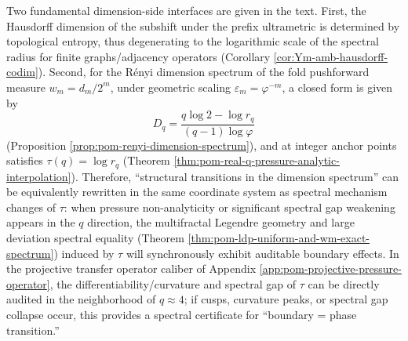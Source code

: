 \begin{remark}\label{rem:pom-dimension-matrix-pressure-unified}
Two fundamental dimension-side interfaces are given in the text.
First, the Hausdorff dimension of the subshift under the prefix ultrametric is determined by topological entropy, thus degenerating to the logarithmic scale of the spectral radius for finite graphs/adjacency operators (Corollary \ref{cor:Ym-amb-hausdorff-codim}).
Second, for the Rényi dimension spectrum of the fold pushforward measure \(w_m=d_m/2^m\), under geometric scaling \(\varepsilon_m=\varphi^{-m}\), a closed form is given by
\[
D_q=\frac{q\log 2-\log r_q}{(q-1)\log\varphi}
\]
(Proposition \ref{prop:pom-renyi-dimension-spectrum}), and at integer anchor points satisfies \(\tau(q)=\log r_q\) (Theorem \ref{thm:pom-real-q-pressure-analytic-interpolation}).
Therefore, ``structural transitions in the dimension spectrum'' can be equivalently rewritten in the same coordinate system as spectral mechanism changes of \(\tau\): when pressure non-analyticity or significant spectral gap weakening appears in the \(q\) direction, the multifractal Legendre geometry and large deviation spectral equality (Theorem \ref{thm:pom-ldp-uniform-and-wm-exact-spectrum}) induced by \(\tau\) will synchronously exhibit auditable boundary effects.
In the projective transfer operator caliber of Appendix \ref{app:pom-projective-pressure-operator}, the differentiability/curvature and spectral gap of \(\tau\) can be directly audited in the neighborhood of \(q\approx 4\); if cusps, curvature peaks, or spectral gap collapse occur, this provides a spectral certificate for ``boundary = phase transition.''
\end{remark}


